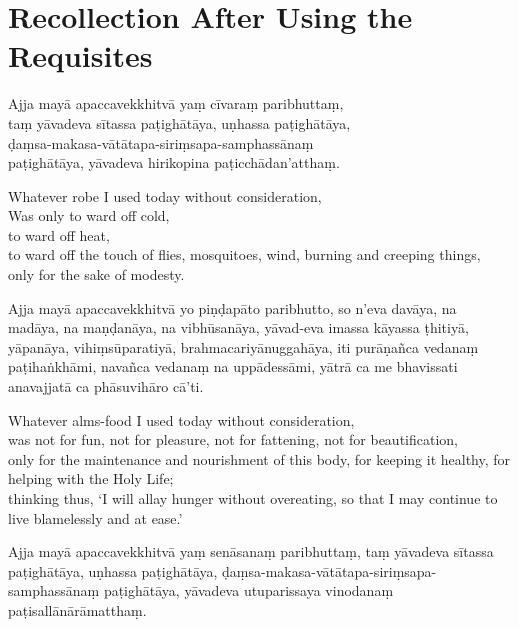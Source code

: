 \section{Recollection After Using the Requisites}
\label{recollection-after-using}

\begin{leader}
\end{leader}


Ajja mayā apaccavekkhitvā yaṃ cīvaraṃ paribhuttaṃ,\\
taṃ yāvadeva sītassa paṭighātāya, uṇhassa paṭighātāya,\\
ḍaṃsa-makasa-vātātapa-siriṃsapa-samphassānaṃ\\
paṭighātāya, yāvadeva hirikopina paṭicchādan'atthaṃ.

\begin{english}
  Whatever robe I used today without consideration,\\
  Was only to ward off cold,\\
  to ward off heat,\\
  to ward off the touch of flies, mosquitoes, wind, burning and creeping things,\\
  only for the sake of modesty.
\end{english}

Ajja mayā apaccavekkhitvā yo piṇḍapāto paribhutto, so n'eva davāya, na madāya, na
maṇḍanāya, na vibhūsanāya, yāvad-eva imassa kāyassa ṭhitiyā, yāpanāya,
vihiṃsūparatiyā, brahmacariyānuggahāya, iti purāṇañca vedanaṃ paṭihaṅkhāmi,
navañca vedanaṃ na uppādessāmi, yātrā ca me bhavissati anavajjatā ca
phāsuvihāro cā'ti.

\begin{english}
  Whatever alms-food I used today without consideration,\\
  was not for fun, not for pleasure, not for fattening, not for beautification,\\
  only for the maintenance and nourishment of this body, for keeping it healthy, for helping with the Holy Life;\\
  thinking thus, `I will allay hunger without overeating, so that I may continue to live blamelessly and at ease.'
\end{english}

Ajja mayā apaccavekkhitvā yaṃ senāsanaṃ paribhuttaṃ, taṃ yāvadeva sītassa
paṭighātāya, uṇhassa paṭighātāya, ḍaṃsa-makasa-vātātapa-siriṃsapa-samphassānaṃ
paṭighātāya, yāvadeva utuparissaya vinodanaṃ paṭisallānārāmatthaṃ.

